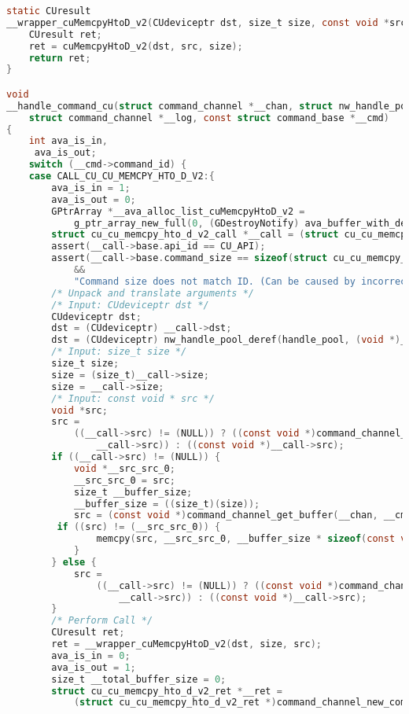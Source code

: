 \begin{lstlisting}[language=C,columns=flexible]
static CUresult
__wrapper_cuMemcpyHtoD_v2(CUdeviceptr dst, size_t size, const void *src) {
    CUresult ret;
    ret = cuMemcpyHtoD_v2(dst, src, size);
    return ret;
}

void
__handle_command_cu(struct command_channel *__chan, struct nw_handle_pool *handle_pool,
    struct command_channel *__log, const struct command_base *__cmd)
{
    int ava_is_in,
     ava_is_out;
    switch (__cmd->command_id) {
    case CALL_CU_CU_MEMCPY_HTO_D_V2:{
        ava_is_in = 1;
        ava_is_out = 0;
        GPtrArray *__ava_alloc_list_cuMemcpyHtoD_v2 =
            g_ptr_array_new_full(0, (GDestroyNotify) ava_buffer_with_deallocator_free);
        struct cu_cu_memcpy_hto_d_v2_call *__call = (struct cu_cu_memcpy_hto_d_v2_call *)__cmd;
        assert(__call->base.api_id == CU_API);
        assert(__call->base.command_size == sizeof(struct cu_cu_memcpy_hto_d_v2_call)
            &&
            "Command size does not match ID. (Can be caused by incorrectly computed buffer sizes, expecially using `strlen(s)` instead of `strlen(s)+1`)");
        /* Unpack and translate arguments */
        /* Input: CUdeviceptr dst */
        CUdeviceptr dst;
        dst = (CUdeviceptr) __call->dst;
        dst = (CUdeviceptr) nw_handle_pool_deref(handle_pool, (void *)__call->dst);
        /* Input: size_t size */
        size_t size;
        size = (size_t)__call->size;
        size = __call->size;
        /* Input: const void * src */
        void *src;
        src =
            ((__call->src) != (NULL)) ? ((const void *)command_channel_get_buffer(__chan, __cmd,
                __call->src)) : ((const void *)__call->src);
        if ((__call->src) != (NULL)) {
            void *__src_src_0;
            __src_src_0 = src;
            size_t __buffer_size;
            __buffer_size = ((size_t)(size));
            src = (const void *)command_channel_get_buffer(__chan, __cmd, __call->src);
         if ((src) != (__src_src_0)) {
                memcpy(src, __src_src_0, __buffer_size * sizeof(const void));
            }
        } else {
            src =
                ((__call->src) != (NULL)) ? ((const void *)command_channel_get_buffer(__chan, __cmd,
                    __call->src)) : ((const void *)__call->src);
        }
        /* Perform Call */
        CUresult ret;
        ret = __wrapper_cuMemcpyHtoD_v2(dst, size, src);
        ava_is_in = 0;
        ava_is_out = 1;
        size_t __total_buffer_size = 0;
        struct cu_cu_memcpy_hto_d_v2_ret *__ret =
            (struct cu_cu_memcpy_hto_d_v2_ret *)command_channel_new_command(__chan,

\end{lstlisting}
